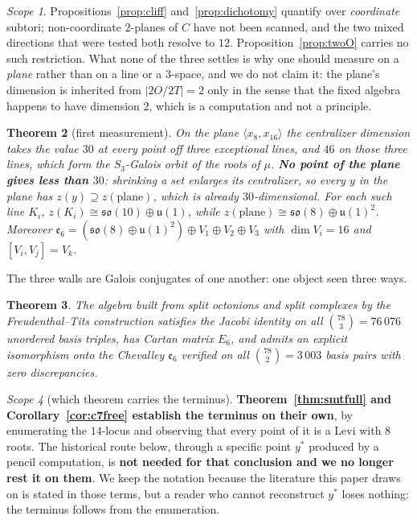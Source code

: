 \documentclass[11pt,reqno]{amsart}
\theoremstyle{plain}
\newtheorem{theorem}{Theorem}[section]
\theoremstyle{definition}
\theoremstyle{remark}
\newtheorem{scope}[theorem]{Scope}
\newcommand{\so}{\mathfrak{so}}
\newcommand{\uu}{\mathfrak{u}}
\newcommand{\ee}{\mathfrak{e}}
\begin{document}
\begin{scope}\label{sc:cliffscope}
Propositions~\ref{prop:cliff} and~\ref{prop:dichotomy} quantify over \emph{coordinate}
subtori; non-coordinate $2$-planes of $C$ have not been scanned, and the two mixed
directions that were tested both resolve to $12$. Proposition~\ref{prop:twoO} carries no
such restriction. What none of the three settles is why one should measure on a
\emph{plane} rather than on a line or a $3$-space, and we do not claim it: the plane's
dimension is inherited from $\lvert 2O/2T\rvert=2$ only in the sense that the fixed
algebra happens to have dimension $2$, which is a computation and not a principle.
\end{scope}

\begin{theorem}[first measurement]\label{thm:fmt}
On the plane $\langle x_8,x_{16}\rangle$ the centralizer dimension takes the value $30$
at every point off three exceptional lines, and $46$ on those three lines, which form
the $S_3$-Galois orbit of the roots of $\mu$. \textbf{No point of the plane gives less
than $30$}: shrinking a set enlarges its centralizer, so every $y$ in the plane has
$z(y)\supseteq z(\text{plane})$, which is already $30$-dimensional. For each such line $K_i$, $z(K_i)\cong\so(10)\oplus\uu(1)$, while
$z(\text{plane})\cong\so(8)\oplus\uu(1)^2$. Moreover
$\ee_6=(\so(8)\oplus\uu(1)^2)\oplus V_1\oplus V_2\oplus V_3$ with $\dim V_i=16$ and
$[V_i,V_j]=V_k$.
\end{theorem}

The three walls are Galois conjugates of one another: one object seen three ways.

\begin{theorem}\label{thm:magic}
The algebra built from split octonions and split complexes by the Freudenthal--Tits
construction satisfies the Jacobi identity on all $\binom{78}{3}=76\,076$ unordered
basis triples, has Cartan matrix $E_6$, and admits an explicit isomorphism onto the
Chevalley $\ee_6$ verified on all $\binom{78}{2}=3\,003$ basis pairs with zero
discrepancies.
\end{theorem}

\begin{scope}[which theorem carries the terminus]\label{sc:whichthm}
\textbf{Theorem~\ref{thm:smtfull} and Corollary~\ref{cor:c7free} establish the terminus
on their own}, by enumerating the $14$-locus and observing that every point of it is a
Levi with $8$ roots. The historical route below, through a specific point $y^*$ produced
by a pencil computation, is \textbf{not needed for that conclusion and we no longer rest
it on them}. We keep the notation because the literature this paper draws on is stated
in those terms, but a reader who cannot reconstruct $y^*$ loses nothing: the terminus
follows from the enumeration.
\end{scope}
\end{document}
